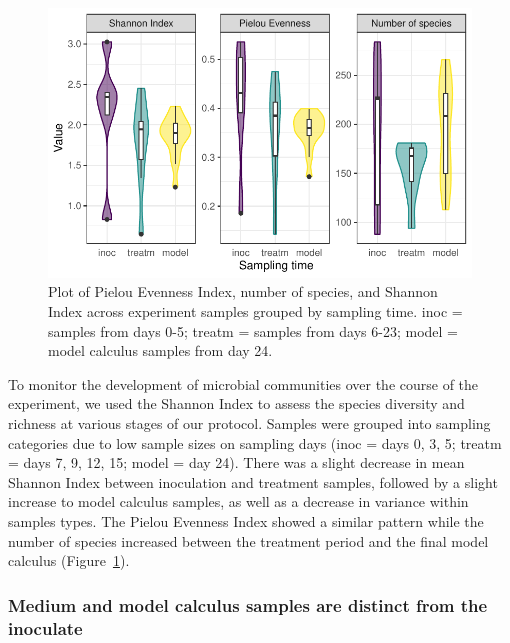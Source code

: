 \documentclass[
]{article}
\begin{document}
\begin{figure}

{\centering \includegraphics{index_files/figure-pdf/fig-diversity-byoc-1.pdf}

}

\caption{\label{fig-diversity-byoc}Plot of Pielou Evenness Index, number
of species, and Shannon Index across experiment samples grouped by
sampling time. inoc = samples from days 0-5; treatm = samples from days
6-23; model = model calculus samples from day 24.}

\end{figure}

To monitor the development of microbial communities over the course of
the experiment, we used the Shannon Index to assess the species
diversity and richness at various stages of our protocol. Samples were
grouped into sampling categories due to low sample sizes on sampling
days (inoc = days 0, 3, 5; treatm = days 7, 9, 12, 15; model = day 24).
There was a slight decrease in mean Shannon Index between inoculation
and treatment samples, followed by a slight increase to model calculus
samples, as well as a decrease in variance within samples types. The
Pielou Evenness Index showed a similar pattern while the number of
species increased between the treatment period and the final model
calculus (Figure~\ref{fig-diversity-byoc}).

\hypertarget{medium-and-model-calculus-samples-are-distinct-from-the-inoculate}{%
\subsubsection{Medium and model calculus samples are distinct from the
inoculate}\label{medium-and-model-calculus-samples-are-distinct-from-the-inoculate}}
\end{document}
